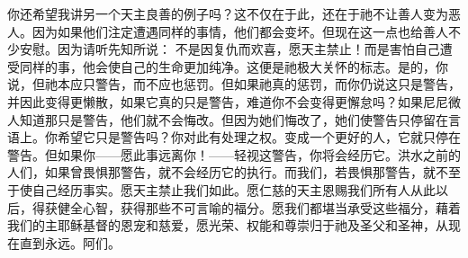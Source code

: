 你还希望我讲另一个天主良善的例子吗？这不仅在于此，还在于祂不让善人变为恶人。因为如果他们注定遭遇同样的事情，他们都会变坏。但现在这一点也给善人不少安慰。因为请听先知所说： \newline{}不是因复仇而欢喜，愿天主禁止！而是害怕自己遭受同样的事，他会使自己的生命更加纯净。这便是祂极大关怀的标志。\newline{}是的，你说，但祂本应只警告，而不应也惩罚。但如果祂真的惩罚，而你仍说这只是警告，并因此变得更懒散，如果它真的只是警告，难道你不会变得更懈怠吗？\newline{}如果尼尼微人知道那只是警告，他们就不会悔改。但因为她们悔改了，她们使警告只停留在言语上。你希望它只是警告吗？你对此有处理之权。变成一个更好的人，它就只停在警告。但如果你——愿此事远离你！——轻视这警告，你将会经历它。\newline{}洪水之前的人们，如果曾畏惧那警告，就不会经历它的执行。而我们，若畏惧那警告，就不至于使自己经历事实。愿天主禁止我们如此。愿仁慈的天主恩赐我们所有人从此以后，得获健全心智，获得那些不可言喻的福分。愿我们都堪当承受这些福分，藉着我们的主耶稣基督的恩宠和慈爱，愿光荣、权能和尊崇归于祂及圣父和圣神，从现在直到永远。阿们。\par

